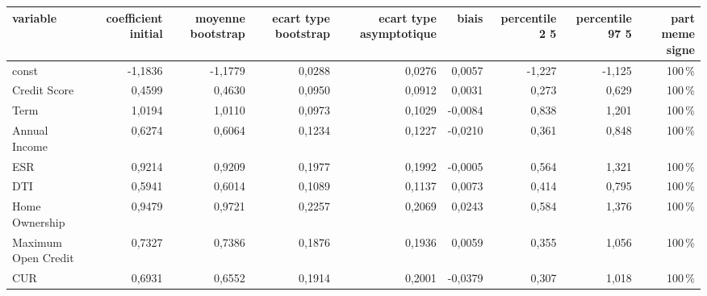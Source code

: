 \begin{tabular}{lrrrrrrrr}
\toprule
\textbf{variable} & \textbf{coefficient initial} & \textbf{moyenne bootstrap} & \textbf{ecart type bootstrap} & \textbf{ecart type asymptotique} & \textbf{biais} & \textbf{percentile 2 5} & \textbf{percentile 97 5} & \textbf{part meme signe} \\
\midrule
const & -1,1836 & -1,1779 & 0,0288 & 0,0276 & 0,0057 & -1,227 & -1,125 & 100\,\% \\
Credit Score & 0,4599 & 0,4630 & 0,0950 & 0,0912 & 0,0031 & 0,273 & 0,629 & 100\,\% \\
Term & 1,0194 & 1,0110 & 0,0973 & 0,1029 & -0,0084 & 0,838 & 1,201 & 100\,\% \\
Annual Income & 0,6274 & 0,6064 & 0,1234 & 0,1227 & -0,0210 & 0,361 & 0,848 & 100\,\% \\
ESR & 0,9214 & 0,9209 & 0,1977 & 0,1992 & -0,0005 & 0,564 & 1,321 & 100\,\% \\
DTI & 0,5941 & 0,6014 & 0,1089 & 0,1137 & 0,0073 & 0,414 & 0,795 & 100\,\% \\
Home Ownership & 0,9479 & 0,9721 & 0,2257 & 0,2069 & 0,0243 & 0,584 & 1,376 & 100\,\% \\
Maximum Open Credit & 0,7327 & 0,7386 & 0,1876 & 0,1936 & 0,0059 & 0,355 & 1,056 & 100\,\% \\
CUR & 0,6931 & 0,6552 & 0,1914 & 0,2001 & -0,0379 & 0,307 & 1,018 & 100\,\% \\
\bottomrule
\end{tabular}
